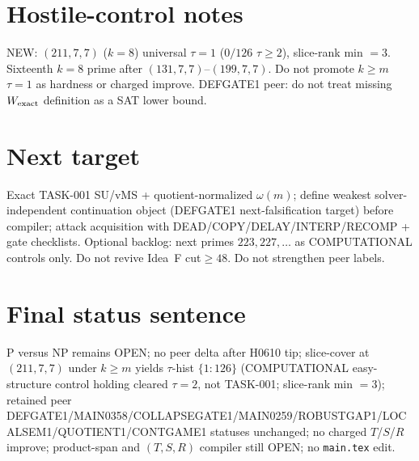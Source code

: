 \documentclass[11pt]{article}
\begin{document}
\section*{Hostile-control notes}
NEW: $(211,7,7)$ ($k{=}8$) universal $\tau{=}1$ ($0/126$ $\tau{\ge}2$), slice-rank min $=3$.
Sixteenth $k{=}8$ prime after $(131,7,7)$--$(199,7,7)$.
Do not promote $k{\ge}m$ $\tau{=}1$ as hardness or charged improve.
DEFGATE1 peer: do not treat missing $W_{\rm exact}$ definition as a SAT lower bound.

\section*{Next target}
Exact TASK-001 SU/vMS + quotient-normalized $\omega(m)$; define weakest solver-independent
continuation object (DEFGATE1 next-falsification target) before compiler;
attack acquisition with DEAD/COPY/DELAY/INTERP/RECOMP + gate checklists.
Optional backlog: next primes $223,227,\ldots$ as COMPUTATIONAL controls only.
Do not revive Idea~F cut$\ge48$. Do not strengthen peer labels.

\section*{Final status sentence}
P versus NP remains OPEN; no peer delta after H0610 tip; slice-cover at $(211,7,7)$ under $k{\ge}m$ yields $\tau$-hist $\{1{:}126\}$ (COMPUTATIONAL easy-structure control holding cleared $\tau{=}2$, not TASK-001; slice-rank min $=3$); retained peer DEFGATE1/MAIN0358/COLLAPSEGATE1/MAIN0259/ROBUSTGAP1/LOCALSEM1/QUOTIENT1/CONTGAME1 statuses unchanged; no charged $T$/$S$/$R$ improve; product-span and $(T,S,R)$ compiler still OPEN; no \texttt{main.tex} edit.
\end{document}
